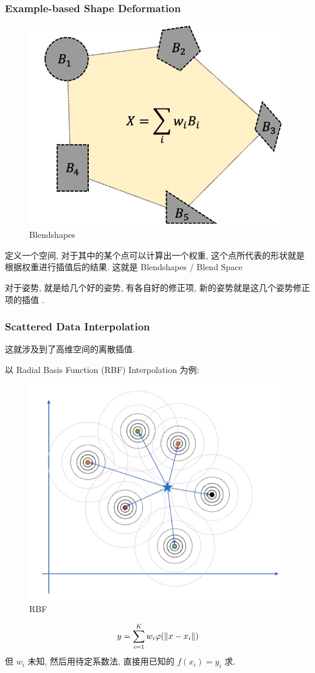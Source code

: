 \subsubsection{Example-based Shape Deformation}
\begin{figure}[!htb]
    \centering
    \includegraphics[width=0.618\linewidth]{pic/1057/Blendshapes}
    \caption{Blendshapes}
\end{figure}
定义一个空间, 对于其中的某个点可以计算出一个权重, 这个点所代表的形状就是根据权重进行插值后的结果. 这就是 Blendshapes / Blend Space

对于姿势, 就是给几个好的姿势, 有各自好的修正项, 新的姿势就是这几个姿势修正项的插值 . 

\subsubsection{Scattered Data Interpolation}
这就涉及到了高维空间的离散插值. 

以 Radial Basis Function (RBF) Interpolation 为例:
\begin{figure}[!htb]
    \centering
    \includegraphics[width=0.618\linewidth]{pic/1057/RBF.png}
    \caption{RBF}
\end{figure}
\begin{align*}
    y=\sum_{i=1}^K w_i \varphi (\left\lVert x-x_i\right\rVert)
\end{align*}
但 $w_i$ 未知, 然后用待定系数法, 直接用已知的 $f(x_i)=y_i$ 求. 

